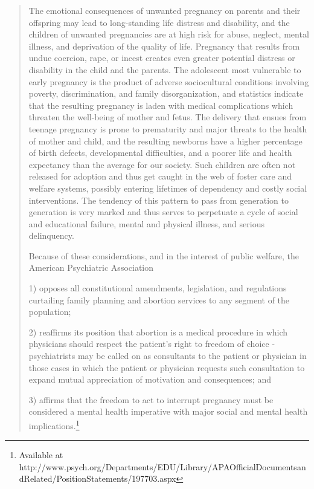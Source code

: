 \begin{quote}

The emotional consequences of unwanted pregnancy on parents and their offspring may lead to long-standing life distress and disability, and the children of unwanted pregnancies are at high risk for abuse, neglect, mental illness, and deprivation of the quality of life. Pregnancy that results from undue coercion, rape, or incest creates even greater potential distress or disability in the child and the parents. The adolescent most vulnerable to early pregnancy is the product of adverse sociocultural conditions involving poverty, discrimination, and family disorganization, and statistics indicate that the resulting pregnancy is laden with medical complications which threaten the well-being of mother and fetus. The delivery that ensues from teenage pregnancy is prone to prematurity and major threats to the health of mother and child, and the resulting newborns have a higher percentage of birth defects, developmental difficulties, and a poorer life and health expectancy than the average for our society. Such children are often not released for adoption and thus get caught in the web of foster care and welfare systems, possibly entering lifetimes of dependency and costly social interventions. The tendency of this pattern to pass from generation to generation is very marked and thus serves to perpetuate a cycle of social and educational failure, mental and physical illness, and serious delinquency.

Because of these considerations, and in the interest of public welfare, the American Psychiatric Association

1) opposes all constitutional amendments, legislation, and regulations curtailing family planning and abortion services to any segment of the population; 

2) reaffirms its position that abortion is a medical procedure in which physicians should respect the patient's right to freedom of choice - psychiatrists may be called on as consultants to the patient or physician in those cases in which the patient or physician requests such consultation to expand mutual appreciation of motivation and consequences; and 

3) affirms that the freedom to act to interrupt pregnancy must be considered a mental health imperative with major social and mental health implications.\footnote{Available at http:\slash \slash www.psych.org\slash Departments\slash EDU\slash Library\slash APAOfficialDocumentsandRelated\slash PositionStatements\slash 197703.aspx}
\end{quote}

